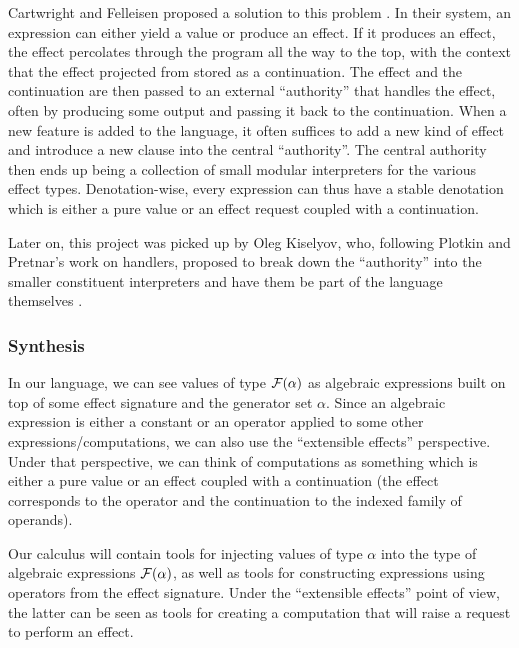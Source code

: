 Cartwright and Felleisen proposed a solution to this problem
\cite{cartwright1994extensible}. In their system, an expression can either
yield a value or produce an effect. If it produces an effect, the effect
percolates through the program all the way to the top, with the context
that the effect projected from stored as a continuation. The effect and the
continuation are then passed to an external ``authority'' that handles the
effect, often by producing some output and passing it back to the
continuation. When a new feature is added to the language, it often
suffices to add a new kind of effect and introduce a new clause into the
central ``authority''. The central authority then ends up being a
collection of small modular interpreters for the various effect
types. Denotation-wise, every expression can thus have a stable denotation
which is either a pure value or an effect request coupled with a
continuation.

Later on, this project was picked up by Oleg Kiselyov, who, following
Plotkin and Pretnar's work on handlers, proposed to break down the
``authority'' into the smaller constituent interpreters and have them be
part of the language themselves \cite{kiselyov2013extensible}.

\subsubsection*{Synthesis}

In our language, we can see values of type $\mathcal{F}(\alpha)$ as
algebraic expressions built on top of some effect signature and the
generator set $\alpha$. Since an
{algebraic expression} is either a constant or an operator applied to some
other expressions/computations, we can also use the ``extensible effects''
perspective. Under that perspective, we can think of computations as
something which is either a pure value or an effect coupled with a
continuation (the effect corresponds to the operator and the continuation
to the indexed family of operands).

Our calculus will contain tools for injecting values of type $\alpha$ into
the type of algebraic expressions $\mathcal{F}(\alpha)$, as well as tools
for constructing expressions using operators from the effect
signature. Under the ``extensible effects'' point of view, the latter can
be seen as tools for creating a computation that will raise a request to
perform an effect.

